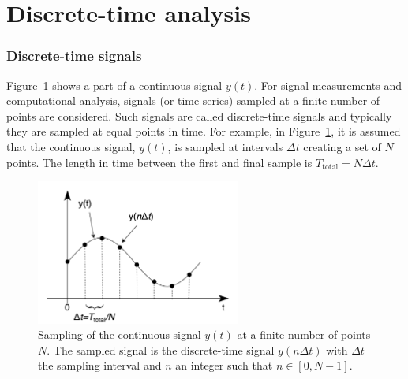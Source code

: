\section{Discrete-time analysis}\label{app:discrete_time_analysis}

\subsubsection*{Discrete-time signals} %
Figure~\ref{fig:sampling_of_continuous_signal} shows a part of a continuous signal $y(t)$. For signal measurements and computational analysis, signals (or time series) sampled at a finite number of points are considered. Such signals are called discrete-time signals and typically they are sampled at equal points in time. For example, in Figure~\ref{fig:sampling_of_continuous_signal}, it is assumed that the continuous signal, $y(t)$, is sampled at intervals $\Delta t$ creating a set of $N$ points. The length in time between the first and final sample is $T_\mathrm{total} = N\Delta t$.


\begin{figure}[!ht]
     \centering         
     \includegraphics[width=0.6\textwidth]{./images/app_B/approximation_of_continuous_to_discrete_signal.png}
         \caption{Sampling of the continuous signal $y(t)$ at a finite number of points $N$. The sampled signal is the discrete-time signal $y(n\Delta t)$ with $\Delta t$ the sampling interval and  $n$ an integer such that $n \in \left[0,N-1 \right ]$.}
         \label{fig:sampling_of_continuous_signal}
\end{figure}

